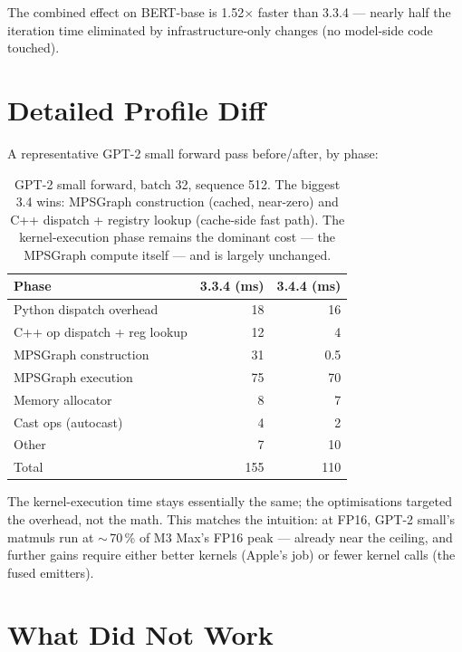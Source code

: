 The combined effect on BERT-base is 1.52$\times$ faster than
3.3.4 --- nearly half the iteration time eliminated by
infrastructure-only changes (no model-side code touched).

\section{Detailed Profile Diff}
\label{sec:mpsgraph_dispatch:profile_diff}

A representative GPT-2 small forward pass before/after, by
phase:

\begin{table}[t]
\centering
\small
\begin{tabular}{lrr}
\toprule
Phase & 3.3.4 (ms) & 3.4.4 (ms) \\
\midrule
Python dispatch overhead   & 18  & 16 \\
C++ op dispatch + reg lookup & 12  & 4 \\
MPSGraph construction      & 31  & 0.5 \\
MPSGraph execution         & 75  & 70 \\
Memory allocator           & 8   & 7 \\
Cast ops (autocast)        & 4   & 2 \\
Other                      & 7   & 10 \\
\midrule
Total                      & 155 & 110 \\
\bottomrule
\end{tabular}
\caption[Phase-level profile diff.]{GPT-2 small forward,
batch 32, sequence 512. The biggest 3.4 wins: MPSGraph
construction (cached, near-zero) and C++ dispatch + registry
lookup (cache-side fast path). The kernel-execution phase
remains the dominant cost --- the MPSGraph compute itself ---
and is largely unchanged.}
\label{tab:mpsgraph_dispatch:profile_diff}
\end{table}

The kernel-execution time stays essentially the same; the
optimisations targeted the overhead, not the math. This
matches the intuition: at FP16, GPT-2 small's matmuls run at
$\sim$\,70\,\% of M3 Max's FP16 peak --- already near the
ceiling, and further gains require either better kernels
(Apple's job) or fewer kernel calls (the fused emitters).

\section{What Did Not Work}
\label{sec:mpsgraph_dispatch:what_did_not_work}

